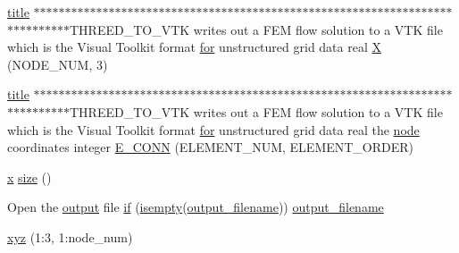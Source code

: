\begin{DoxyCompactItemize}
\item 
\hyperlink{a00617_a051e403214cb6872ad3fe4e50302a6ee}{title} $\ast$$\ast$$\ast$$\ast$$\ast$$\ast$$\ast$$\ast$$\ast$$\ast$$\ast$$\ast$$\ast$$\ast$$\ast$$\ast$$\ast$$\ast$$\ast$$\ast$$\ast$$\ast$$\ast$$\ast$$\ast$$\ast$$\ast$$\ast$$\ast$$\ast$$\ast$$\ast$$\ast$$\ast$$\ast$$\ast$$\ast$$\ast$$\ast$$\ast$$\ast$$\ast$$\ast$$\ast$$\ast$$\ast$$\ast$$\ast$$\ast$$\ast$$\ast$$\ast$$\ast$$\ast$$\ast$$\ast$$\ast$$\ast$$\ast$$\ast$$\ast$$\ast$$\ast$$\ast$$\ast$$\ast$$\ast$$\ast$$\ast$$\ast$$\ast$$\ast$$\ast$$\ast$$\ast$$\ast$$\ast$T\+H\+R\+E\+E\+D\+\_\+\+T\+O\+\_\+\+V\+TK writes out a F\+EM flow solution to a V\+TK file which is the Visual Toolkit format \hyperlink{a00623_ad1e7380d51df1e0043d24d3c8a860e0a}{for} unstructured grid data real \hyperlink{a00611_a708712aede48a739e9ae0c42413ef460}{X} (N\+O\+D\+E\+\_\+\+N\+UM, 3)
\item 
\hyperlink{a00617_a051e403214cb6872ad3fe4e50302a6ee}{title} $\ast$$\ast$$\ast$$\ast$$\ast$$\ast$$\ast$$\ast$$\ast$$\ast$$\ast$$\ast$$\ast$$\ast$$\ast$$\ast$$\ast$$\ast$$\ast$$\ast$$\ast$$\ast$$\ast$$\ast$$\ast$$\ast$$\ast$$\ast$$\ast$$\ast$$\ast$$\ast$$\ast$$\ast$$\ast$$\ast$$\ast$$\ast$$\ast$$\ast$$\ast$$\ast$$\ast$$\ast$$\ast$$\ast$$\ast$$\ast$$\ast$$\ast$$\ast$$\ast$$\ast$$\ast$$\ast$$\ast$$\ast$$\ast$$\ast$$\ast$$\ast$$\ast$$\ast$$\ast$$\ast$$\ast$$\ast$$\ast$$\ast$$\ast$$\ast$$\ast$$\ast$$\ast$$\ast$$\ast$$\ast$T\+H\+R\+E\+E\+D\+\_\+\+T\+O\+\_\+\+V\+TK writes out a F\+EM flow solution to a V\+TK file which is the Visual Toolkit format \hyperlink{a00623_ad1e7380d51df1e0043d24d3c8a860e0a}{for} unstructured grid data real the \hyperlink{a00611_adf51fe9945b6ca147057cc27ff639d0f}{node} coordinates integer \hyperlink{a00611_aa0b17be6b1bfa8923f062948fbe42544}{E\+\_\+\+C\+O\+NN} (E\+L\+E\+M\+E\+N\+T\+\_\+\+N\+UM, E\+L\+E\+M\+E\+N\+T\+\_\+\+O\+R\+D\+ER)
\item 
\hyperlink{a00605_ac98c3bb25378222646e977292011625f}{x} \hyperlink{a00611_ad6cb0afbbe6ea4f56407890be2533966}{size} ()
\item 
Open the \hyperlink{a00623_a934120182a1459d17613528940e2bc61}{output} file \hyperlink{a00611_a96c738d3e2120c4273f9d4390761d99e}{if} (\hyperlink{a00608_ad2a182e2e8932167c056732723f13e1c}{isempty}(\hyperlink{a00617_a5934d690c688edbd92210f38fe5855e7}{output\+\_\+filename})) \hyperlink{a00617_a5934d690c688edbd92210f38fe5855e7}{output\+\_\+filename}
\item 
\hyperlink{a00611_a6444a221e6b74abaf6d67d44af2650a0}{xyz} (1\+:3, 1\+:node\+\_\+num)
\item 

\end{DoxyCompactItemize}
